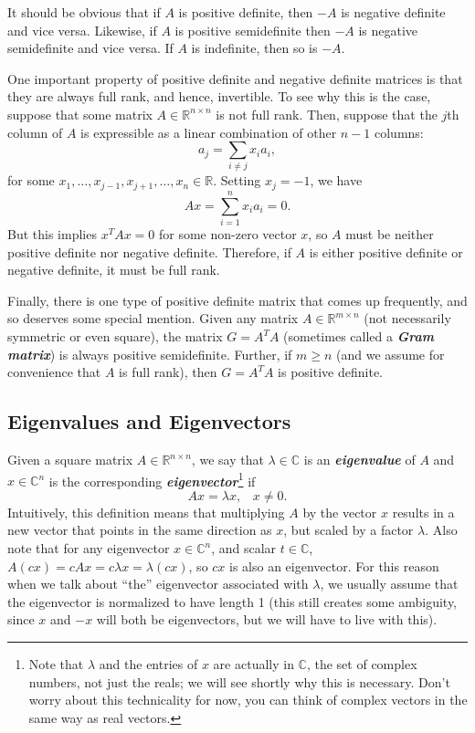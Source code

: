 \documentclass[12pt]{article}
\begin{document}
It should be obvious that if $A$ is positive definite, then $-A$ is
negative definite and vice versa.  Likewise, if $A$ is positive
semidefinite then $-A$ is negative semidefinite and vice versa.  If
$A$ is indefinite, then so is $-A$.  

One important property of positive definite and negative definite matrices 
is that they are always full rank, and hence, invertible.  To see why
this is the case, suppose that some matrix $A \in \mathbb{R}^{n \times n}$
is not full rank.  Then, suppose that the $j$th column of $A$ is expressible 
as a linear combination of other $n-1$ columns:
\[ a_j = \sum_{i \neq j} x_i a_i, \]
for some $x_1,\ldots,x_{j-1}, x_{j+1}, \ldots,x_{n} \in \mathbb{R}$.  Setting $x_j = -1$, we have
\[ Ax = \sum_{i=1}^n x_i a_i = 0. \]
But this implies $x^T Ax = 0$ for some non-zero vector $x$, so $A$ must be
neither positive definite nor negative definite.  Therefore, if $A$ is
either positive definite or negative definite, it must be full rank.

Finally, there is one type of positive definite matrix that comes up
frequently, and so deserves some special mention.  Given any matrix $A
\in \mathbb{R}^{m \times n}$ (not necessarily symmetric or even
square), the matrix $G = A^T A$ (sometimes called a
\textbf{\textit{Gram matrix}}) is always positive semidefinite.
Further, if $m \geq n$ (and we assume for convenience that $A$ is full
rank), then $G = A^T A$ is positive definite.

\subsection{Eigenvalues and Eigenvectors}

Given a square matrix $A \in \mathbb{R}^{n \times n}$, we say that
$\lambda \in \mathbb{C}$ is an \textbf{\textit{eigenvalue}} of $A$ and
$x \in \mathbb{C}^n$  is the corresponding
\textbf{\textit{eigenvector}}\footnote{Note that $\lambda$ and the
  entries of $x$ are actually in 
$\mathbb{C}$, the set of complex numbers, not just the reals; we
will see shortly why this is necessary. Don't worry about this
technicality for now, you can think of complex vectors in the same way
as real vectors.} if
\[Ax = \lambda x, \;\;\; x \neq 0. \]
Intuitively, this definition
means that multiplying $A$ by the vector $x$ results in a new vector
that points in the same direction as $x$, but scaled by a factor
$\lambda$.  Also note that for any eigenvector $x \in \mathbb{C}^n$,
and scalar $t \in \mathbb{C}$, 
$A(cx) = cAx = c \lambda x = \lambda(cx)$, so $cx$ is also an
eigenvector.   For this reason when we talk about ``the'' eigenvector
associated with $\lambda$, we usually assume that the eigenvector is
normalized to have length 1 (this still creates some ambiguity, since
$x$ and $-x$ will both be eigenvectors, but we will have to live with
this).
\end{document}
